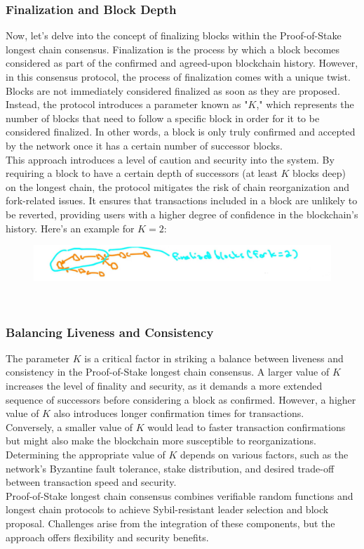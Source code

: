 \subsubsection{Finalization and Block Depth}
Now, let's delve into the concept of finalizing blocks within the Proof-of-Stake longest chain consensus. Finalization is the process by which a block becomes considered as part of the confirmed and agreed-upon blockchain history. However, in this consensus protocol, the process of finalization comes with a unique twist.\\
Blocks are not immediately considered finalized as soon as they are proposed. Instead, the protocol introduces a parameter known as "$K$," which represents the number of blocks that need to follow a specific block in order for it to be considered finalized. In other words, a block is only truly confirmed and accepted by the network once it has a certain number of successor blocks.\\
This approach introduces a level of caution and security into the system. By requiring a block to have a certain depth of successors (at least $K$ blocks deep) on the longest chain, the protocol mitigates the risk of chain reorganization and fork-related issues. It ensures that transactions included in a block are unlikely to be reverted, providing users with a higher degree of confidence in the blockchain's history.
Here's an example for $K=2$:
\begin{figure}[h]
    \centering
    \includegraphics[scale = 0.5]{figures/f54.png}
    \caption{}
    \label{fig:mesh1}
\end{figure}\\

\subsubsection{Balancing Liveness and Consistency}
The parameter $K$ is a critical factor in striking a balance between liveness and consistency in the Proof-of-Stake longest chain consensus. A larger value of $K$ increases the level of finality and security, as it demands a more extended sequence of successors before considering a block as confirmed. However, a higher value of $K$ also introduces longer confirmation times for transactions.\\
Conversely, a smaller value of $K$ would lead to faster transaction confirmations but might also make the blockchain more susceptible to reorganizations. Determining the appropriate value of $K$ depends on various factors, such as the network's Byzantine fault tolerance, stake distribution, and desired trade-off between transaction speed and security.\\
Proof-of-Stake longest chain consensus combines verifiable random functions and longest chain protocols to achieve Sybil-resistant leader selection and block proposal. Challenges arise from the integration of these components, but the approach offers flexibility and security benefits.

